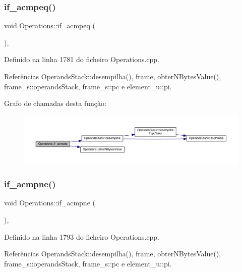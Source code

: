 \subsubsection{\texorpdfstring{if\+\_\+acmpeq()}{if\_acmpeq()}}
{\footnotesize\ttfamily void Operations\+::if\+\_\+acmpeq (\begin{DoxyParamCaption}{ }\end{DoxyParamCaption})\hspace{0.3cm}{\ttfamily [static]}, {\ttfamily [private]}}



Definido na linha 1781 do ficheiro Operations.\+cpp.



Referências Operands\+Stack\+::desempilha(), frame, obter\+N\+Bytes\+Value(), frame\+\_\+s\+::operands\+Stack, frame\+\_\+s\+::pc e element\+\_\+u\+::pi.

Grafo de chamadas desta função\+:\nopagebreak
\begin{figure}[H]
\begin{center}
\leavevmode
\includegraphics[width=350pt]{classOperations_aa0432645b0d0effb4d4d839ea2dcec1c_cgraph}
\end{center}
\end{figure}
\mbox{\label{classOperations_a7f43bbfba9b2feb66b695d24c43dc430}} 
\subsubsection{\texorpdfstring{if\+\_\+acmpne()}{if\_acmpne()}}
{\footnotesize\ttfamily void Operations\+::if\+\_\+acmpne (\begin{DoxyParamCaption}{ }\end{DoxyParamCaption})\hspace{0.3cm}{\ttfamily [static]}, {\ttfamily [private]}}



Definido na linha 1793 do ficheiro Operations.\+cpp.



Referências Operands\+Stack\+::desempilha(), frame, obter\+N\+Bytes\+Value(), frame\+\_\+s\+::operands\+Stack, frame\+\_\+s\+::pc e element\+\_\+u\+::pi.

